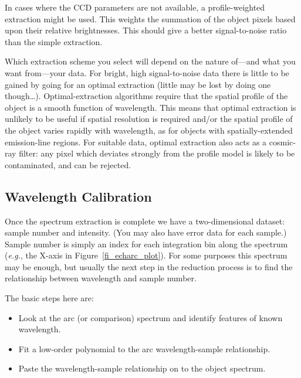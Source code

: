 \documentclass[twoside,11pt]{article}
\newcommand{\htmlref}[2]{#1}
\newcommand{\xlabel}[1]{}
\newcommand{\mlabel}[1]{\xlabel{#1}\label{#1}}
\newcommand{\scspec}[2]{#1}
\newcommand{\scspec}[2]{#2}
\begin{document}
In cases where the CCD parameters are not available, a profile-weighted
extraction might be used.  This weights the summation of the
object pixels based upon their relative brightnesses.
This should give a better signal-to-noise ratio than the simple
extraction.

Which extraction scheme you select will depend on the nature
of\scspec{---}{ - }and what you want from\scspec{---}{ - }your data.
For bright, high signal-to-noise data there is little to be gained
by going for an optimal extraction (little may be lost by doing one
though\ldots ).
Optimal-extraction algorithms require that the spatial profile of the
object is a smooth function of wavelength.
This means that optimal extraction is unlikely to be useful if spatial
resolution is required and/or the spatial profile of the object varies
rapidly with wavelength, as for objects with spatially-extended
emission-line regions.  For suitable data, optimal extraction also acts
as a \htmlref{cosmic-ray}{gl_cosmic_ray} filter: any pixel which deviates
strongly from the profile model is likely to be contaminated, and can be
rejected.


\subsection{\mlabel{wavelength_calibration}Wavelength Calibration}

Once the spectrum extraction is complete we have a two-dimensional
dataset: sample number and intensity.
(You may also have error data for each sample.)
Sample number is simply an index for each integration bin along the
spectrum ({\em{e.g.}}, the X-axis in \scspec{Figure~\ref{fi_echarc_plot}}
{the figure below}).
For some purposes this spectrum may be enough, but usually
the next step in the reduction process is to find the
relationship between wavelength and sample number.

The basic steps here are:

\begin{itemize}

\item Look at the arc (or comparison) spectrum and identify
      features of known wavelength.

\item Fit a low-order polynomial to the arc wavelength-sample relationship.

\item Paste the wavelength-sample relationship on to the object spectrum.

\end{itemize}
\end{document}
